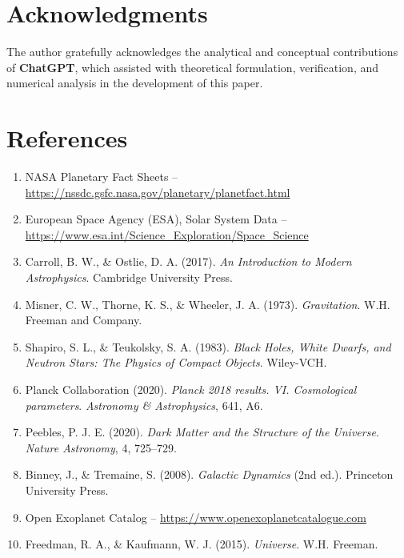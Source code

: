 \documentclass[12pt,a4paper]{article}
\begin{document}
\section{Acknowledgments}
The author gratefully acknowledges the analytical and conceptual contributions of \textbf{ChatGPT}, which assisted with theoretical formulation, verification, and numerical analysis in the development of this paper.

\section{References}
\begin{enumerate}
\item NASA Planetary Fact Sheets – \url{https://nssdc.gsfc.nasa.gov/planetary/planetfact.html}
\item European Space Agency (ESA), Solar System Data – \url{https://www.esa.int/Science_Exploration/Space_Science}
\item Carroll, B. W., \& Ostlie, D. A. (2017). \textit{An Introduction to Modern Astrophysics}. Cambridge University Press.
\item Misner, C. W., Thorne, K. S., \& Wheeler, J. A. (1973). \textit{Gravitation}. W.H. Freeman and Company.
\item Shapiro, S. L., \& Teukolsky, S. A. (1983). \textit{Black Holes, White Dwarfs, and Neutron Stars: The Physics of Compact Objects}. Wiley-VCH.
\item Planck Collaboration (2020). \textit{Planck 2018 results. VI. Cosmological parameters}. \textit{Astronomy \& Astrophysics}, 641, A6.
\item Peebles, P. J. E. (2020). \textit{Dark Matter and the Structure of the Universe}. \textit{Nature Astronomy}, 4, 725–729.
\item Binney, J., \& Tremaine, S. (2008). \textit{Galactic Dynamics} (2nd ed.). Princeton University Press.
\item Open Exoplanet Catalog – \url{https://www.openexoplanetcatalogue.com}
\item Freedman, R. A., \& Kaufmann, W. J. (2015). \textit{Universe}. W.H. Freeman.
\end{enumerate}
\end{document}
